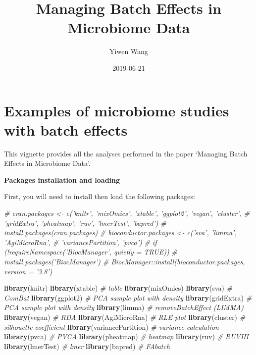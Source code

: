 \documentclass[]{book}
\title{Managing Batch Effects in Microbiome Data}
\author{Yiwen Wang}
\date{2019-06-21}
\newenvironment{Shaded}{\begin{snugshade}}{\end{snugshade}}
\newcommand{\KeywordTok}[1]{\textcolor[rgb]{0.13,0.29,0.53}{\textbf{#1}}}
\newcommand{\CommentTok}[1]{\textcolor[rgb]{0.56,0.35,0.01}{\textit{#1}}}
\newcommand{\NormalTok}[1]{#1}
\begin{document}
\maketitle

{
\setcounter{tocdepth}{3}
\tableofcontents
}
\chapter{Examples of microbiome studies with batch
effects}\label{examples-of-microbiome-studies-with-batch-effects}

This vignette provides all the analyses performed in the paper `Managing
Batch Effects in Microbiome Data'.

\textbf{Packages installation and loading}

First, you will need to install then load the following packages:

\begin{Shaded}
\begin{Highlighting}[]
\CommentTok{# cran.packages <- c('knitr', 'mixOmics', 'xtable', 'ggplot2', 'vegan', 'cluster',}
\CommentTok{#                   'gridExtra', 'pheatmap', 'ruv', 'lmerTest', 'bapred')}
\CommentTok{# install.packages(cran.packages)}
\CommentTok{# bioconductor.packages <- c('sva', 'limma', 'AgiMicroRna', }
\CommentTok{#                           'variancePartition', 'pvca')}
\CommentTok{# if (!requireNamespace('BiocManager', quietly = TRUE))}
\CommentTok{#     install.packages('BiocManager')}
\CommentTok{# BiocManager::install(bioconductor.packages, version = '3.8')}

\KeywordTok{library}\NormalTok{(knitr)}
\KeywordTok{library}\NormalTok{(xtable) }\CommentTok{# table}
\KeywordTok{library}\NormalTok{(mixOmics)}
\KeywordTok{library}\NormalTok{(sva) }\CommentTok{# ComBat}
\KeywordTok{library}\NormalTok{(ggplot2) }\CommentTok{# PCA sample plot with density}
\KeywordTok{library}\NormalTok{(gridExtra) }\CommentTok{# PCA sample plot with density}
\KeywordTok{library}\NormalTok{(limma) }\CommentTok{# removeBatchEffect (LIMMA)}
\KeywordTok{library}\NormalTok{(vegan) }\CommentTok{# RDA}
\KeywordTok{library}\NormalTok{(AgiMicroRna) }\CommentTok{# RLE plot}
\KeywordTok{library}\NormalTok{(cluster) }\CommentTok{# silhouette coefficient}
\KeywordTok{library}\NormalTok{(variancePartition) }\CommentTok{# variance calculation}
\KeywordTok{library}\NormalTok{(pvca) }\CommentTok{# PVCA}
\KeywordTok{library}\NormalTok{(pheatmap) }\CommentTok{# heatmap}
\KeywordTok{library}\NormalTok{(ruv) }\CommentTok{# RUVIII}
\KeywordTok{library}\NormalTok{(lmerTest) }\CommentTok{# lmer}
\KeywordTok{library}\NormalTok{(bapred) }\CommentTok{# FAbatch}
\end{Highlighting}
\end{Shaded}
\end{document}

